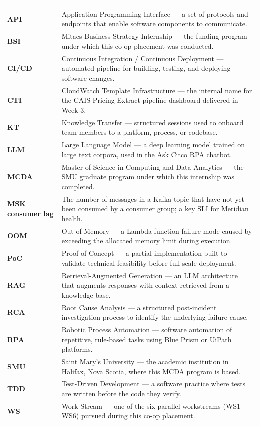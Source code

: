 {\begin{longtable}{@{\hspace{\tabcolsep}}>{\bfseries}p{}p{}@{\hspace{\tabcolsep}}}
\multicolumn{2}{l}{\textit{\textbf{General Technical Terms}}} \\
\hline
API & Application Programming Interface — a set of protocols and endpoints that enable software components to communicate. \\
BSI & Mitacs Business Strategy Internship — the funding program under which this co-op placement was conducted. \\
CI/CD & Continuous Integration / Continuous Deployment — automated pipeline for building, testing, and deploying software changes. \\
CTI & CloudWatch Template Infrastructure — the internal name for the CAIS Pricing Extract pipeline dashboard delivered in Week 3. \\
KT & Knowledge Transfer — structured sessions used to onboard team members to a platform, process, or codebase. \\
LLM & Large Language Model — a deep learning model trained on large text corpora, used in the Ask Citco RPA chatbot. \\
MCDA & Master of Science in Computing and Data Analytics — the SMU graduate program under which this internship was completed. \\
MSK consumer lag & The number of messages in a Kafka topic that have not yet been consumed by a consumer group; a key SLI for Meridian health. \\
OOM & Out of Memory — a Lambda function failure mode caused by exceeding the allocated memory limit during execution. \\
PoC & Proof of Concept — a partial implementation built to validate technical feasibility before full-scale deployment. \\
RAG & Retrieval-Augmented Generation — an LLM architecture that augments responses with context retrieved from a knowledge base. \\
RCA & Root Cause Analysis — a structured post-incident investigation process to identify the underlying failure cause. \\
RPA & Robotic Process Automation — software automation of repetitive, rule-based tasks using Blue Prism or UiPath platforms. \\
SMU & Saint Mary's University — the academic institution in Halifax, Nova Scotia, where this MCDA program is based. \\
TDD & Test-Driven Development — a software practice where tests are written before the code they verify. \\
WS & Work Stream — one of the six parallel workstreams (WS1--WS6) pursued during this co-op placement. \\

\hline
\end{longtable}}
\endgroup
